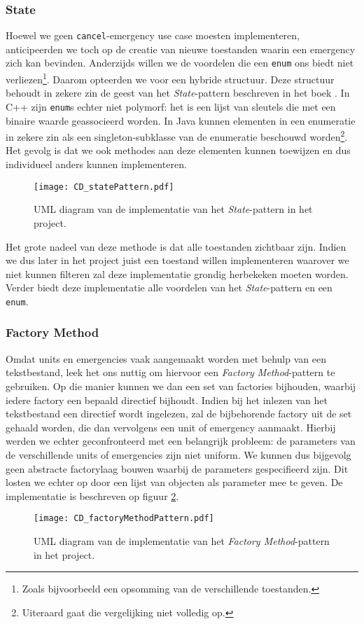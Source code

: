 \subsubsection{State}
Hoewel we geen \verb+cancel+-emergency use case moesten implementeren, anticipeerden we toch op de creatie van nieuwe toestanden waarin een emergency zich kan bevinden.
Anderzijds willen we de voordelen die een \verb+enum+ ons biedt niet verliezen\footnote{Zoals bijvoorbeeld een opsomming van de verschillende toestanden.}. Daarom opteerden we voor een hybride structuur. Deze structuur behoudt in zekere zin de geest van het \textit{State}-pattern beschreven in het boek \cite{book:designpatterns}. In C++ zijn \verb+enum+s echter niet polymorf: het is een lijst van sleutels die met een binaire waarde geassocieerd worden. In Java kunnen elementen in een enumeratie in zekere zin als een singleton-subklasse van de enumeratie beschouwd worden\footnote{Uiteraard gaat die vergelijking niet volledig op.}. Het gevolg is dat we ook methodes aan deze elementen kunnen toewijzen en dus individueel anders kunnen implementeren.
\begin{figure}[h!]
\texttt{[image: CD\_statePattern.pdf]}
\caption{UML diagram van de implementatie van het \textit{State}-pattern in het project.}
\label{fig:statePattern}
\end{figure}
Het grote nadeel van deze methode is dat alle toestanden zichtbaar zijn. Indien we dus later in het project juist een toestand willen implementeren waarover we niet kunnen filteren zal deze implementatie grondig herbekeken moeten worden. Verder biedt deze implementatie alle voordelen van het \textit{State}-pattern en een \verb+enum+.
\subsubsection{Factory Method}
Omdat units en emergencies vaak aangemaakt worden met behulp van een tekstbestand, leek het ons nuttig om hiervoor een \textit{Factory Method}-pattern te gebruiken. Op die manier kunnen we dan een set van factories bijhouden, waarbij iedere factory een bepaald directief bijhoudt. Indien bij het inlezen van het tekstbestand een directief wordt ingelezen, zal de bijbehorende factory uit de set gehaald worden, die dan vervolgens een unit of emergency aanmaakt. Hierbij werden we echter geconfronteerd met een belangrijk probleem: de parameters van de verschillende units of emergencies zijn niet uniform. We kunnen dus bijgevolg geen abstracte factorylaag bouwen waarbij de parameters gespecifieerd zijn. Dit losten we echter op door een lijst van objecten als parameter mee te geven. De implementatie is beschreven op figuur \ref{fig:factoryMethodPattern}.
\begin{figure}[h!]
\texttt{[image: CD\_factoryMethodPattern.pdf]}
\caption{UML diagram van de implementatie van het \textit{Factory Method}-pattern in het project.}
\label{fig:factoryMethodPattern}
\end{figure}
